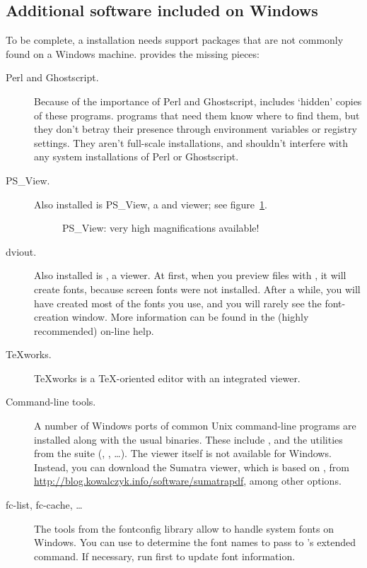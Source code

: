 \documentclass{article}
\begin{document}
\subsection{Additional software included on Windows}

To be complete, a \TL{} installation needs support packages that are not
commonly found on a Windows machine. \TL{} provides the missing
pieces:
\begin{description}
\item[Perl and Ghostscript.] Because of the importance of Perl and
  Ghostscript, \TL{} includes `hidden' copies of these
  programs. \TL{} programs that need them know where to find them,
  but they don't betray their presence through environment variables
  or registry settings. They aren't full-scale installations, and
  shouldn't interfere with any system installations of Perl or
  Ghostscript.

\item[PS\_View.] Also installed is PS\_View, a \PS{} and 
  viewer; see figure~\ref{fig:psview}.

\begin{figure}[tb]
\caption{PS\_View: very high magnifications available!}\label{fig:psview}
\end{figure}

\item[dviout.] Also installed is , a  viewer.
  At first, when you preview files with , it will create
  fonts, because screen fonts were not installed. After a while, you
  will have created most of the fonts you use, and you will rarely see
  the font-creation window.  More information can be found in the
  (highly recommended) on-line help.

\item[\TeX{}works.]  \TeX{}works is a \TeX-oriented editor with
  an integrated  viewer.

\item[Command-line tools.] A number of Windows ports of common Unix
  command-line programs are installed along with the usual \TL{}
  binaries. These include ,  and the
  utilities from the  suite (,
  , \ldots).  The  viewer itself is not
  available for Windows. Instead, you can download the Sumatra
   viewer, which is based on , from
  \url{http://blog.kowalczyk.info/software/sumatrapdf}, among other options.

\item[fc-list, fc-cache, \ldots] The tools from the fontconfig library allow
  \XeTeX{} to handle system fonts on Windows.  You can use
   to determine the font names to pass to \XeTeX's
  extended  command. If necessary, run 
  first to update font information.

\end{description}
\end{document}
